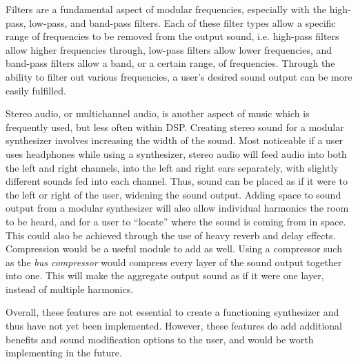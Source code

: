 Filters are a fundamental aspect of modular frequencies, especially with the high-pass, low-pass, and band-pass filters. Each of these filter types allow a specific range of frequencies to be removed from the output sound, i.e. high-pass filters allow higher frequencies through, low-pass filters allow lower frequencies, and band-pass filters allow a band, or a certain range, of frequencies. Through the ability to filter out various frequencies, a user's desired sound output can be more easily fulfilled. 

Stereo audio, or multichannel audio, is another aspect of music which is frequently used, but less often within DSP. Creating stereo sound for a modular synthesizer involves increasing the width of the sound. Most noticeable if a user uses headphones while using a synthesizer, stereo audio will feed audio into both the left and right channels, into the left and right ears separately, with slightly different sounds fed into each channel. Thus, sound can be placed as if it were to the left or right of the user, widening the sound output. Adding space to sound output from a modular synthesizer will also allow individual harmonics the room to be heard, and for a user to ``locate'' where the sound is coming from in space. This could also be achieved through the use of heavy reverb and delay effects. Compression would be a useful module to add as well. Using a compressor such as the \textit{bus compressor} would compress every layer of the sound output together into one. This will make the aggregate output sound as if it were one layer, instead of multiple harmonics.

Overall, these features are not essential to create a functioning synthesizer and thus have not yet been implemented. However, these features do add additional benefits and sound modification options to the user, and would be worth implementing in the future. 